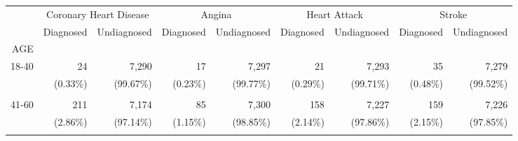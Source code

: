 \documentclass{article}
\begin{document}
\begin{tabular}{lllllllll}
\cline{1-9}
\multicolumn{1}{c}{} &
  \multicolumn{2}{|c}{Coronary Heart Disease} &
  \multicolumn{2}{c}{Angina} &
  \multicolumn{2}{c}{Heart Attack} &
  \multicolumn{2}{c}{Stroke} \\
\multicolumn{1}{c}{} &
  \multicolumn{1}{|r}{Diagnosed} &
  \multicolumn{1}{r}{Undiagnosed} &
  \multicolumn{1}{r}{Diagnosed} &
  \multicolumn{1}{r}{Undiagnosed} &
  \multicolumn{1}{r}{Diagnosed} &
  \multicolumn{1}{r}{Undiagnosed} &
  \multicolumn{1}{r}{Diagnosed} &
  \multicolumn{1}{r}{Undiagnosed} \\
\cline{1-9}
\multicolumn{1}{r}{AGE} &
  \multicolumn{1}{|r}{} &
  \multicolumn{1}{r}{} &
  \multicolumn{1}{r}{} &
  \multicolumn{1}{r}{} &
  \multicolumn{1}{r}{} &
  \multicolumn{1}{r}{} &
  \multicolumn{1}{r}{} &
  \multicolumn{1}{r}{} \\
\multicolumn{1}{r}{18-40\hspace{1em}} &
  \multicolumn{1}{|r}{24} &
  \multicolumn{1}{r}{7,290} &
  \multicolumn{1}{r}{17} &
  \multicolumn{1}{r}{7,297} &
  \multicolumn{1}{r}{21} &
  \multicolumn{1}{r}{7,293} &
  \multicolumn{1}{r}{35} &
  \multicolumn{1}{r}{7,279} \\
\multicolumn{1}{r}{} &
  \multicolumn{1}{|r}{(0.33\%)} &
  \multicolumn{1}{r}{(99.67\%)} &
  \multicolumn{1}{r}{(0.23\%)} &
  \multicolumn{1}{r}{(99.77\%)} &
  \multicolumn{1}{r}{(0.29\%)} &
  \multicolumn{1}{r}{(99.71\%)} &
  \multicolumn{1}{r}{(0.48\%)} &
  \multicolumn{1}{r}{(99.52\%)} \\
\multicolumn{1}{r}{} &
  \multicolumn{1}{|r}{} &
  \multicolumn{1}{r}{} &
  \multicolumn{1}{r}{} &
  \multicolumn{1}{r}{} &
  \multicolumn{1}{r}{} &
  \multicolumn{1}{r}{} &
  \multicolumn{1}{r}{} &
  \multicolumn{1}{r}{} \\
\multicolumn{1}{r}{41-60\hspace{1em}} &
  \multicolumn{1}{|r}{211} &
  \multicolumn{1}{r}{7,174} &
  \multicolumn{1}{r}{85} &
  \multicolumn{1}{r}{7,300} &
  \multicolumn{1}{r}{158} &
  \multicolumn{1}{r}{7,227} &
  \multicolumn{1}{r}{159} &
  \multicolumn{1}{r}{7,226} \\
\multicolumn{1}{r}{} &
  \multicolumn{1}{|r}{(2.86\%)} &
  \multicolumn{1}{r}{(97.14\%)} &
  \multicolumn{1}{r}{(1.15\%)} &
  \multicolumn{1}{r}{(98.85\%)} &
  \multicolumn{1}{r}{(2.14\%)} &
  \multicolumn{1}{r}{(97.86\%)} &
  \multicolumn{1}{r}{(2.15\%)} &
  \multicolumn{1}{r}{(97.85\%)} \\
\multicolumn{1}{r}{} &
  \multicolumn{1}{|r}{} &
  \multicolumn{1}{r}{} &

\end{tabular}
\end{document}
